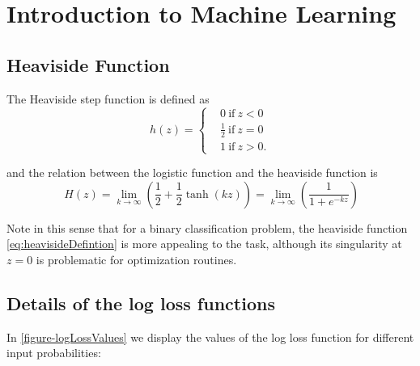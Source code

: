 \setcounter{secnumdepth}{2} %
\chapter{Introduction to Machine Learning}
\label{appx:introMachineLearning}

\section{Heaviside Function}\label{appx:sec:heaviside}

The Heaviside step function is defined as
\begin{equation}\label{eq:heavisideDefintion}
h(z) =
\begin{cases}
&0 \ \mbox{if} \ z<0 \\
&\frac{1}{2} \ \mbox{if} \ z=0 \\
&1 \ \mbox{if} \ z>0.
\end{cases}
\end{equation}

and the relation between the logistic function and the heaviside function is
\begin{equation}
 \ H(z) = \lim_{k \to \infty} \left(\frac{1}{2} + \frac{1}{2}\tanh(kz) \right) = \lim_{k \to \infty} \left(\frac{1}{1+e^{-kz}} \right)
\end{equation}

Note in this sense that for a binary classification problem, the heaviside function \cref{eq:heavisideDefintion} is more appealing to the task, although its singularity at $z=0$ is problematic for optimization routines.

\section{Details of the log loss functions}\label{appx:sec:loglossDetails}

In \cref{figure-logLossValues} we display the values of the log loss function for different input probabilities:

